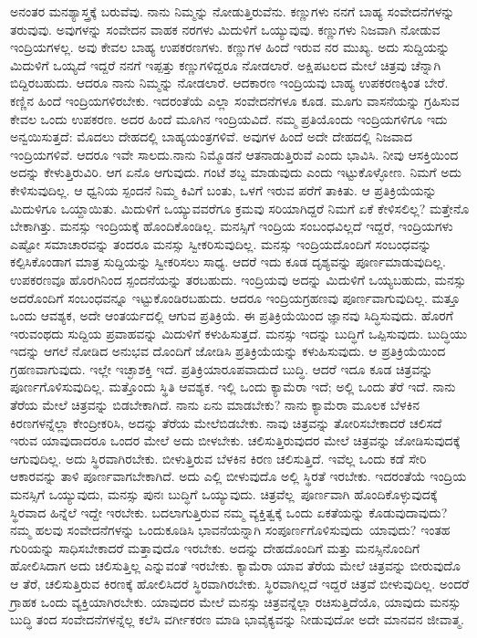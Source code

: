 ಅನಂತರ ಮನಶ್ಯಾಸ್ತ್ರಕ್ಕೆ ಬರುವೆವು. ನಾನು ನಿಮ್ಮನ್ನು ನೋಡುತ್ತಿರುವೆನು. ಕಣ್ಣುಗಳು ನನಗೆ ಬಾಹ್ಯ ಸಂವೇದನೆಗಳನ್ನು ತರುವುವು. ಅವುಗಳನ್ನು ಸಂವೇದನ ವಾಹಕ ನರಗಳು ಮಿದುಳಿಗೆ ಒಯ್ಯುವುವು. ಕಣ್ಣುಗಳು ನಿಜವಾಗಿ ನೋಡುವ ಇಂದ್ರಿಯಗಳಲ್ಲ. ಅವು ಕೇವಲ ಬಾಹ್ಯ ಉಪಕರಣಗಳು. ಕಣ್ಣುಗಳ ಹಿಂದೆ ಇರುವ ನರ ಮುಖ್ಯ. ಅದು ಸುದ್ದಿಯನ್ನು ಮಿದುಳಿಗೆ ಒಯ್ಯದೆ ಇದ್ದರೆ ನನಗೆ ಇಪ್ಪತ್ತು ಕಣ್ಣುಗಳಿದ್ದರೂ ನೋಡಲಾರೆ. ಅಕ್ಷಿಪಟಲದ ಮೇಲೆ ಚಿತ್ರವು ಚೆನ್ನಾಗಿ ಬಿದ್ದಿರಬಹುದು. ಆದರೂ ನಾನು ನಿಮ್ಮನ್ನು ನೋಡಲಾರೆ. ಆದಕಾರಣ ಇಂದ್ರಿಯವು ಬಾಹ್ಯ ಉಪಕರಣಕ್ಕಿಂತ ಬೇರೆ. ಕಣ್ಣಿನ ಹಿಂದೆ ಇಂದ್ರಿಯಗಳಿರಬೇಕು. ಇದರಂತೆಯೆ ಎಲ್ಲಾ ಸಂವೇದನೆಗಳೂ ಕೂಡ. ಮೂಗು ವಾಸನೆಯನ್ನು ಗ್ರಹಿಸುವ ಕೇವಲ ಒಂದು ಉಪಕರಣ. ಅದರ ಹಿಂದೆ ಮೂಗಿನ ಇಂದ್ರಿಯವಿದೆ. ನಮ್ಮ ಪ್ರತಿಯೊಂದು ಇಂದ್ರಿಯಗಳಿಗೂ ಇದು ಅನ್ವಯಿಸುತ್ತದೆ: ಮೊದಲು ದೇಹದಲ್ಲಿ ಬಾಹ್ಯಯಂತ್ರಗಳಿವೆ. ಅವುಗಳ ಹಿಂದೆ ಅದೇ ದೇಹದಲ್ಲಿ ನಿಜವಾದ ಇಂದ್ರಿಯಗಳಿವೆ. ಆದರೂ ಇವೇ ಸಾಲದು.ನಾನು ನಿಮ್ಮೊಡನೆ ಆತನಾಡುತ್ತಿರುವೆ ಎಂದು ಭಾವಿಸಿ. ನೀವು ಆಸಕ್ತಿಯಿಂದ ಅದನ್ನು ಕೇಳುತ್ತಿರುವಿರಿ. ಆಗ ಏನೊ ಆಗುವುದು. ಗಂಟೆ ಶಬ್ದ ಮಾಡುವುದು ಎಂದು ಇಟ್ಟುಕೊಳ್ಳೋಣ. ನಿಮಗೆ ಅದು ಕೇಳಿಸುವುದಿಲ್ಲ. ಆ ಧ್ವನಿಯ ಸ್ಪಂದನೆ ನಿಮ್ಮ ಕಿವಿಗೆ ಬಂತು, ಒಳಗೆ ಇರುವ ಪರೆಗೆ ತಾಕಿತು. ಆ ಪ್ರತಿಕ್ರಿಯೆಯನ್ನು ಮಿದುಳಿಗೂ ಒಯ್ದಾಯಿತು. ಮಿದುಳಿಗೆ ಒಯ್ಯುವವರೆಗೂ ಕ್ರಮವು ಸರಿಯಾಗಿದ್ದರೆ ನಿಮಗೆ ಏಕೆ ಕೇಳಿಸಲಿಲ್ಲ? ಮತ್ತೇನೊ ಬೇಕಾಗಿತ್ತು. ಮನಸ್ಸು ಇಂದ್ರಿಯಕ್ಕೆ ಹೊಂದಿಕೊಂಡಿಲ್ಲ. ಮನಸ್ಸಿಗೆ ಇಂದ್ರಿಯ ಸಂಬಂಧವಿಲ್ಲದೆ ಇದ್ದರೆ, ಇಂದ್ರಿಯಗಳು ಎಷ್ಟೋ ಸಮಾಚಾರವನ್ನು ತಂದರೂ ಮನಸ್ಸು ಸ್ವೀಕರಿಸುವುದಿಲ್ಲ. ಮನಸ್ಸು ಇಂದ್ರಿಯದೊಂದಿಗೆ ಸಂಬಂಧವನ್ನು ಕಲ್ಪಿಸಿಕೊಂಡಾಗ ಮಾತ್ರ ಸುದ್ದಿಯನ್ನು ಸ್ವೀಕರಿಸಲು ಸಾಧ್ಯ. ಆದರೆ ಇದು ಕೂಡ ದೃಶ್ಯವನ್ನು ಪೂರ್ಣಮಾಡುವುದಿಲ್ಲ. ಉಪಕರಣವೂ ಹೊರಗಿನಿಂದ ಸ್ಪಂದನೆಯನ್ನು ತರಬಹುದು. ಇಂದ್ರಿಯವು ಅದನ್ನು ಮಿದುಳಿಗೆ ಒಯ್ಯಬಹುದು, ಮನಸ್ಸು ಅದರೊಂದಿಗೆ ಸಂಬಂಧವನ್ನೂ ಇಟ್ಟುಕೊಂಡಿರಬಹುದು. ಆದರೂ ಇಂದ್ರಿಯಗ್ರಹಣವು ಪೂರ್ಣವಾಗುವುದಿಲ್ಲ. ಮತ್ತೂ ಒಂದು ಆವಶ್ಯಕ, ಅದೇ ಆಂತರ್ಯದಲ್ಲಿ ಆಗುವ ಪ್ರತಿಕ್ರಿಯೆ. ಈ ಪ್ರತಿಕ್ರಿಯೆಯಿಂದ ಜ್ಞಾನವು ಸಿದ್ಧಿಸುವುದು. ಹೊರಗೆ ಇರುವಂಥದು ಸುದ್ದಿಯ ಪ್ರವಾಹವನ್ನು ಮಿದುಳಿಗೆ ಕಳುಹಿಸುತ್ತದೆ. ಮನಸ್ಸು ಇದನ್ನು ಬುದ್ಧಿಗೆ ಒಪ್ಪಿಸುವುದು. ಬುದ್ಧಿಯು ಇದನ್ನು ಆಗಲೆ ನೋಡಿದ ಅನುಭವ ದೊಂದಿಗೆ ಜೋಡಿಸಿ ಪ್ರತಿಕ್ರಿಯೆಯನ್ನು ಕಳುಹಿಸುವುದು. ಆ ಪ್ರತಿಕ್ರಿಯೆಯಿಂದ ಗ್ರಹಣವಾಗುವುದು. ಇಲ್ಲೇ ಇಚ್ಛಾಶಕ್ತಿ ಇದೆ. ಪ್ರತಿಕ್ರಿಯಾರೂಪವಾದುದೆ ಬುದ್ಧಿ. ಆದರೆ ಇದೂ ಕೂಡ ಚಿತ್ರವನ್ನು ಪೂರ್ಣಗೊಳಿಸುವುದಿಲ್ಲ. ಮತ್ತೊಂದು ಸ್ಥಿತಿ ಆವಶ್ಯಕ. ಇಲ್ಲಿ ಒಂದು ಕ್ಯಾಮೆರಾ ಇದೆ; ಅಲ್ಲಿ ಒಂದು ತೆರೆ ಇದೆ. ನಾನು ತೆರೆಯ ಮೇಲೆ ಚಿತ್ರವನ್ನು ಬಿಡಬೇಕಾಗಿದೆ. ನಾನು ಏನು ಮಾಡಬೇಕು? ನಾನು ಕ್ಯಾಮೆರಾ ಮೂಲಕ ಬೆಳಕಿನ ಕಿರಣಗಳನ್ನೆಲ್ಲಾ ಕೇಂದ್ರೀಕರಿಸಿ, ಅದನ್ನು ತೆರೆಯ ಮೇಲೆಬಿಡಬೇಕು. ನಾವು ಚಿತ್ರವನ್ನು ತೋರಿಸಬೇಕಾದರೆ ಚಲಿಸದೆ ಇರುವ ಯಾವುದಾದರೂ ಒಂದರ ಮೇಲೆ ಅದು ಬೀಳಬೇಕು. ಚಲಿಸುತ್ತಿರುವುದರ ಮೇಲೆ ಚಿತ್ರವನ್ನು ಜೋಡಿಸುವುದಕ್ಕೆ ಆಗುವುದಿಲ್ಲ. ಅದು ಸ್ಥಿರವಾಗಿರಬೇಕು. ಬೀಳುತ್ತಿರುವ ಬೆಳಕಿನ ಕಿರಣ ಚಲಿಸುತ್ತಿದೆ. ಇವೆಲ್ಲ ಒಂದು ಕಡೆ ಸೇರಿ ಆಕಾರವನ್ನು ತಾಳಿ ಪೂರ್ಣವಾಗಬೇಕಾಗಿದೆ. ಅದು ಎಲ್ಲಿ ಬೀಳುವುದೊ ಅಲ್ಲಿ ಸ್ಥಿರತೆ ಇರಬೇಕು. ಇದರಂತೆಯೆ ಇಂದ್ರಿಯ ಮನಸ್ಸಿಗೆ ಒಯ್ಯುವುದು, ಮನಸ್ಸು ಪುನಃ ಬುದ್ಧಿಗೆ ಒಯ್ಯುವುದು. ಚಿತ್ರವೆಲ್ಲ\break\ ಪೂರ್ಣವಾಗಿ ಹೊಂದಿಕೊಳ್ಳುವುದಕ್ಕೆ ಸ್ಥಿರವಾದ ಹಿನ್ನೆಲೆ ಇದ್ದೇ ಇರಬೇಕು. ಬದಲಾಗುತ್ತಿರುವ ನಮ್ಮ ವ್ಯಕ್ತಿತ್ವಕ್ಕೆ ಒಂದು ಏಕತೆಯನ್ನು ಕೊಡುವುದಾವುದು? ನಮ್ಮ ಹಲವು ಸಂವೇದನೆಗಳನ್ನು ಒಂದುಕೂಡಿಸಿ ಭಾವನೆಯನ್ನಾಗಿ ಸಂಪೂರ್ಣಗೊಳಿಸುವುದು\break\ ಯಾವುದು? ಇಂತಹ ಗುರಿಯನ್ನು ಸಾಧಿಸಬೇಕಾದರೆ ಮತ್ತಾವುದೊ ಇರಬೇಕು. ಅದನ್ನು ದೇಹದೊಂದಿಗೆ ಮತ್ತು ಮನಸ್ಸಿನೊಂದಿಗೆ ಹೋಲಿಸಿದಾಗ ಅದು ಚಲಿಸುತ್ತಿಲ್ಲ ಎನ್ನುವಂತೆ ಇರಬೇಕು. ಕ್ಯಾಮೆರಾ ಯಾವ ತೆರೆಯ ಮೇಲೆ ಚಿತ್ರವನ್ನು ಬೀರುವುದೊ ಆ ತೆರೆ, ಚಲಿಸುತ್ತಿರುವ ಕಿರಣಕ್ಕೆ ಹೋಲಿಸಿದರೆ ಸ್ಥಿರವಾಗಿರಬೇಕು. ಸ್ಥಿರವಾಗಿಲ್ಲದೆ ಇದ್ದರೆ ಚಿತ್ರವೆ ಬೀಳುವುದಿಲ್ಲ. ಅಂದರೆ ಗ್ರಾಹಕ ಒಂದು ವ್ಯಕ್ತಿಯಾಗಿರಬೇಕು. ಯಾವುದರ ಮೇಲೆ ಮನಸ್ಸು ಚಿತ್ರವನ್ನೆಲ್ಲಾ ರಚಿಸುತ್ತಿದೆಯೊ, ಯಾವುದು ಮನಸ್ಸು ಬುದ್ಧಿ ತಂದ ಸಂವೇದನೆಗಳನ್ನೆಲ್ಲ ಕಲೆಸಿ ವರ್ಗೀಕರಣ ಮಾಡಿ ಭಾವೈಕ್ಯವನ್ನು ನೀಡುವುದೋ ಅದೇ ಮಾನವನ ಜೀವಾತ್ಮ.

